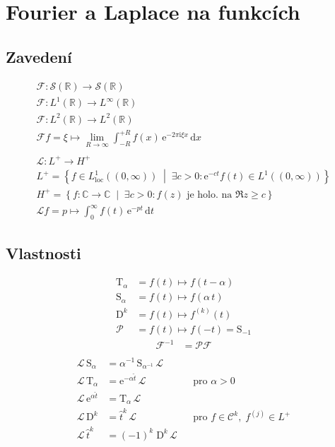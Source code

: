 \documentclass{article}
\def\R{\mathbb{R}}
\def\C{\mathbb{C}}
\def\Cont{\mathcal{C}}
\def\Schwartz{\mathcal{S}}
\def\Fourier{\mathcal{F}}
\def\Laplace{\mathcal{L}}
\def\Parity{\mathcal{P}}
\newcommand{\T}[1]{\mathrm{T}_{#1}}
\renewcommand{\S}[1]{\mathrm{S}_{#1}}
\newcommand{\D}[1]{\mathrm{D}^{#1}}
\def\I{\mathrm{i}}
\newcommand{\e}[1]{\mathrm{e}^{#1}}
\renewcommand{\d}[1]{\mathrm{d}#1 \,}
\newcommand{\setbuilder}[2]{\left\{ #1 \;\middle|\; #2 \right\}}
\begin{document}
\section{Fourier a Laplace na funkcích}
\subsection{Zavedení}
\begin{gather*}
    \Fourier: \Schwartz(\R) \to \Schwartz(\R)
    \\
    \Fourier: L^1(\R) \to L^\infty(\R)
    \\
    \Fourier: L^2(\R) \to L^2(\R)
    \\
    \Fourier f =
    \xi \mapsto
    \lim_{R\to\infty}
    \int_{-R}^{+R} f(x) \, \e{-2\pi\I\xi x} \, \d{x}
    \\\\
    \Laplace: L^+ \to H^+
    \\[5pt]
    L^+ = \setbuilder{f \in L_{\mathrm{loc}}^1((0,\infty))}{\exists c>0: \e{-ct}f(t) \in L^1((0,\infty))}
    \\
    H^+ = \setbuilder{f: \C \to \C}{\exists c>0: f(z)\text{ je holo. na }\Re z \ge c}
    \\[5pt]
    \Laplace f =
    p \mapsto
    \int_0^\infty
    f(t) \, \e{-pt} \, \d{t}
\end{gather*}

\subsection{Vlastnosti}
\begin{align*}
    \T{\alpha} &= f(t) \mapsto f(t-\alpha)
    \\
    \S{\alpha} &= f(t) \mapsto f(\alpha \, t)
    \\
    \D{k} &= f(t) \mapsto f^{(k)}(t)
    \\
    \Parity \, &= f(t) \mapsto f(-t) = \S{-1}
\end{align*}
\begin{align*}
    \Fourier^{-1} &= \Parity \Fourier
    \\
\end{align*}
\begin{align*}
    \Laplace \, \S{\alpha}
    &= \alpha^{-1} \, \S{\alpha^{-1}} \, \Laplace
    \\
    \Laplace \, \T{\alpha}
    &= \e{-\alpha \hat t} \, \Laplace
    & & \text{pro } \alpha > 0
    \\
    \Laplace \, \e{\alpha \hat t}
    &= \T{\alpha} \, \Laplace
    \\
    \Laplace \, \D{k}
    &= \hat t^k \, \Laplace
    & & \text{pro } f \in \Cont^k, \; f^{(j)} \in L^+
    \\
    \Laplace \, \hat t^k \;
    &= (-1)^k \; \D{k} \, \Laplace
\end{align*}
\end{document}
